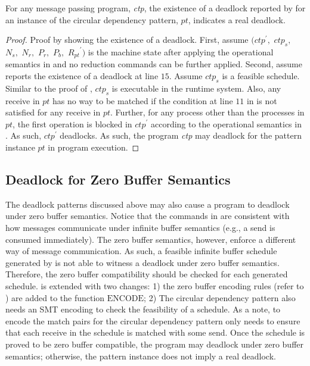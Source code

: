 
\begin{lemma}
For any message passing program, \textit{ctp}, the existence of a deadlock reported by  for an instance of the circular dependency pattern, $\mathit{pt}$, indicates a real deadlock. 
\label{lemma:circular}
\end{lemma}
\begin{proof}
Proof by showing the existence of a deadlock. First, assume $(\mathit{ctp}^\prime,$ $\mathit{ctp}_s,$ $\mathit{N_s},$ $\mathit{N_r},$ $\mathit{P_r},$ $\mathit{P_b},$ $\mathit{R_{pt}}^\prime)$ is the machine state after applying the operational semantics in  and no reduction commands can be further applied. Second, assume  reports the existence of a deadlock at line $15$. Assume $\mathit{ctp}_s$ is a feasible schedule. Similar to the proof of , $\mathit{ctp}_s$ is executable in the runtime system. Also, any receive in $\mathit{pt}$ has no way to be matched if the condition at line $11$ in  is not satisfied for any receive in $\mathit{pt}$. Further, for any process other than the processes in $\mathit{pt}$, the first operation is blocked in $\mathit{ctp}^\prime$ according to the operational semantics in . As such, $\mathit{ctp}^\prime$ deadlocks. As such, the program \textit{ctp} may deadlock for the pattern instance $\mathit{pt}$ in program execution. 
\end{proof} 


\subsection{Deadlock for Zero Buffer Semantics}
The deadlock patterns discussed above may also cause a program to deadlock under zero buffer semantics. Notice that the commands in  are consistent with how messages communicate under infinite buffer semantics (e.g., a send is consumed immediately). The zero buffer semantics, however, enforce a different way of message communication. As such, a feasible infinite buffer schedule generated by  is not able to witness a deadlock under zero buffer semantics. Therefore, the zero buffer compatibility should be checked for each generated schedule.  is extended with two changes: 1) the zero buffer encoding rules (refer to \cite{HuangNFM15}) are added to the function $\mathrm{ENCODE}$; 2) The circular dependency pattern also needs an SMT encoding to check the feasibility of a schedule. As a note, to encode the match pairs for the circular dependency pattern only needs to ensure that each receive in the schedule is matched with some send. Once the schedule is proved to be zero buffer compatible, the program may deadlock under zero buffer semantics; otherwise, the pattern instance does not imply a real deadlock. 


